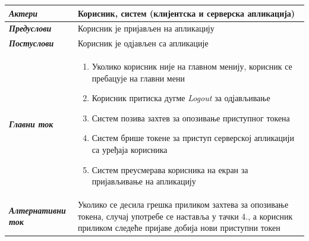 \documentclass[12pt,oneside]{memoir}
\begin{document}
\begin{longtable}{p{0.23\linewidth} p{0.77\linewidth}}
 \hline
 \textit{\textbf{Актери}} & Корисник, систем (клијентска и серверска апликација) \\
\hline

\textit{\textbf{Предуслови}} & Корисник је пријављен на апликацију \\
 \hline


\textit{\textbf{Постуслови}} & Корисник је одјављен са апликације \\
 \hline
 \textit{\textbf{Главни ток}} &  
    \begin{enumerate}
        \item Уколико корисник није на главном менију, корисник се пребацује на главни мени
        \item Корисник притиска дугме \textit{Logout} за одјављивање
        \item Систем позива захтев за опозивање приступног токена
        \item Систем брише токене за приступ серверској апликацији са уређаја корисника
        \item Систем преусмерава корисника на екран за пријављивање на апликацију
    \end{enumerate}\\
 \hline

\textit{\textbf{Алтернативни ток}} & Уколико се десила грешка приликом захтева за опозивање токена, случај употребе се наставља у тачки 4., а корисник приликом следеће пријаве добија нови приступни токен \\
 \hline
 
\end{longtable}

\end{document}
